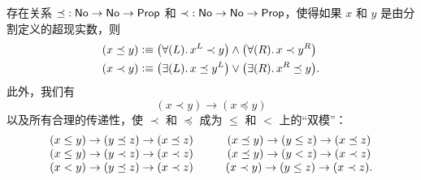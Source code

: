 \begin{thm}\label{defn:No-codes}
  存在关系 $\mathord\preceq:\mathsf{No}\to\mathsf{No}\to\mathsf{Prop}$ 和 $\mathord\prec:\mathsf{No}\to\mathsf{No}\to\mathsf{Prop}$，使得如果 $x$ 和 $y$ 是由分割定义的超现实数，则
  \begin{align*}
    (x\preceq y) &\defeq
    \big(\fall{L} x^L\prec y\big) \land \big(\fall{R} x\prec y^R\big)\\
    (x\prec y) &\defeq
    \big(\exis{L} x\preceq y^L\big) \lor \big(\exis{R} x^R \preceq y\big).
  \end{align*}
  此外，我们有
  \begin{equation}\label{eq:NO-codes-unstrict}
    (x\prec y) \to (x\preceq y)
  \end{equation}
  以及所有合理的传递性，使 $\prec$ 和 $\preceq$ 成为 $\le$ 和 $<$ 上的``双模''：
  \begin{equation}\label{eq:NO-codes-transitivity}
    \begin{array}{c@{\hspace{1cm}}c}
      (x \le y) \to (y\preceq z) \to (x\preceq z) &
      (x \preceq y) \to (y\le z) \to (x\preceq z) \\
      (x \le y) \to (y\prec z) \to (x\prec z) &
      (x \preceq y) \to (y< z) \to (x\prec z) \\
      (x < y) \to (y\preceq z) \to (x\prec z) &
      (x \prec y) \to (y\le z) \to (x\prec z).
  \end{array}
  \end{equation}
\end{thm}

